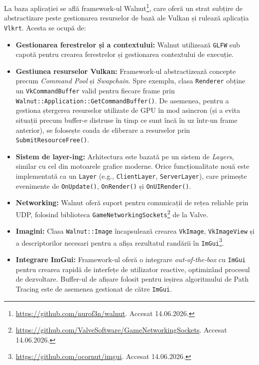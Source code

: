 \documentclass[12pt,a4paper]{report}
\numberwithin{equation}{section} %
\begin{document}
La baza aplicației se află framework-ul Walnut\footnote{\url{https://github.com/nurof3n/walnut}. Accesat 14.06.2026.}, care oferă un strat subțire de abstractizare peste gestionarea resurselor de bază ale Vulkan și rulează aplicația \texttt{Vlkrt}.
Acesta se ocupă de:
\begin{itemize}
    \item \textbf{Gestionarea ferestrelor și a contextului:} Walnut utilizează \texttt{GLFW} sub capotă pentru crearea ferestrelor și gestionarea contextului de execuție.
    \item \textbf{Gestiunea resurselor Vulkan:} Framework-ul abstractizează concepte precum \textit{Command Pool} și \textit{Swapchain}.
        Spre exemplu, clasa \texttt{Renderer} obține un \texttt{VkCommandBuffer} valid pentru fiecare frame prin \texttt{Walnut::Application::GetCommandBuffer()}.
        De asemenea, pentru a gestiona ștergerea resurselor utilizate de GPU în mod asincron (și a evita situații precum buffer-e distruse în timp ce sunt încă în uz într-un frame anterior), se folosește coada de eliberare a resurselor prin \texttt{SubmitResourceFree()}.
    \item \textbf{Sistem de layer-ing:} Arhitectura este bazată pe un sistem de \textit{Layers}, similar cu cel din motoarele grafice moderne.
        Orice funcționalitate nouă este implementată ca un \texttt{Layer} (e.g., \texttt{ClientLayer}, \texttt{ServerLayer}), care primește evenimente de \texttt{OnUpdate()}, \texttt{OnRender()} și \texttt{OnUIRender()}.
    \item \textbf{Networking:} Walnut oferă suport pentru comunicații de rețea reliable prin UDP, folosind biblioteca \texttt{GameNetworkingSockets}\footnote{\label{fn:gamesocket}\url{https://github.com/ValveSoftware/GameNetworkingSockets}. Accesat 14.06.2026.} de la Valve.
    \item \textbf{Imagini:} Clasa \texttt{Walnut::Image} încapsulează crearea \texttt{VkImage}, \texttt{VkImageView} și a descriptorilor necesari pentru a afișa rezultatul randării în \texttt{ImGui}\footnote{\url{https://github.com/ocornut/imgui}. Accesat 14.06.2026.}.
    \item \textbf{Integrare ImGui:} Framework-ul oferă o integrare \textit{out-of-the-box} cu \texttt{ImGui} pentru crearea rapidă de interfețe de utilizator reactive, optimizând procesul de dezvoltare.
        Buffer-ul de afișare folosit pentru ieșirea algoritmului de Path Tracing este de asemenea gestionat de către \texttt{ImGui}.
\end{itemize}
\end{document}

